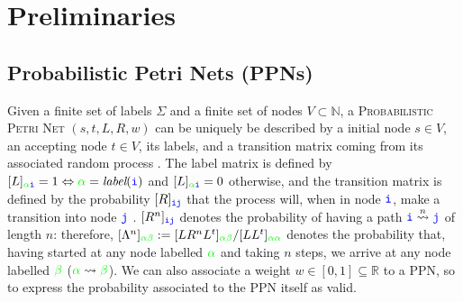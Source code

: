 \section{Preliminaries}
\subsection{Probabilistic Petri Nets (PPNs)}\label{subsec:ppn}
Given a finite set of labels $\Sigma$ and a finite set of nodes $V\subset \mathbb{N}$, a \textsc{Probabilistic Petri Net} $(s,t,L,R,w)$ can be uniquely be described by a initial node $s\in V$, an accepting node $t\in V$, its labels, and a transition matrix coming from its associated random process \cite{GartnerFW03}. The label matrix is defined by $[L]_{{\color{green}\alpha}\texttt{\color{blue}i}}=1\Leftrightarrow {\color{green}\alpha}=\textit{label}(\texttt{\color{blue}i})$ and $[L]_{{\color{green}\alpha}\texttt{\color{blue}i}}=0$ otherwise, and the transition matrix is defined by the probability $[R]_{\texttt{\color{blue}ij}}$ that the process will, when in node $\texttt{\color{blue}i}$, make a transition into node $\texttt{\color{blue}j}$ \cite{Prob}. $[R^n]_{\texttt{\color{blue}ij}}$ denotes the probability of having a path $\texttt{\color{blue}i}\overset{n}{\rightsquigarrow}\texttt{\color{blue}j}$ of length $n$: therefore, $[\Lambda^n]_{\color{green}\alpha\beta}:=[LR^nL^t]_{\color{green}\alpha\beta}/[LL^t]_{\color{green}\alpha\alpha}$ denotes the probability that, having started at any node labelled $\color{green}\alpha$ and taking $n$ steps, we arrive at any node labelled $\color{green}\beta$ (${\color{green}\alpha}\rightsquigarrow{\color{green}\beta}$). 
We can also associate a weight $w\in[0,1]\subseteq\mathbb{R}$ to a PPN, so to express the probability associated to the PPN itself as valid.

